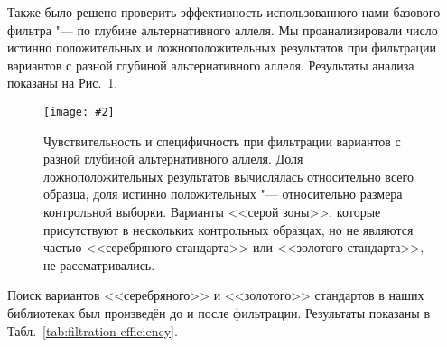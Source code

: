 \documentclass[a4paper,14pt]{extarticle}
\newcommand{\centerfigure}[5]
{\begin{figure}[#1]\centering\texttt{[image: \#2]}\caption{\label{#3}#4}\end{figure}}
\newcommand{\picref}[1]{Рис.~\ref{#1}}
\newcommand{\tableref}[1]{Табл.~\ref{#1}}
\begin{document}
Также было решено проверить эффективность использованного нами базового фильтра "--- по глубине альтернативного аллеля.
Мы проанализировали число истинно положительных и ложноположительных результатов при фильтрации вариантов с разной глубиной альтернативного аллеля.
Результаты анализа показаны на \picref{fig:true-false-depth}.

\centerfigure{hp!}{True-false-depth.pdf}{fig:true-false-depth}{Чувствительность и специфичность при фильтрации вариантов с разной глубиной альтернативного аллеля. Доля ложноположительных результатов вычислялась относительно всего образца, доля истинно положительных "--- относительно размера контрольной выборки. Варианты <<серой зоны>>, которые присутствуют в нескольких контрольных образцах, но не являются частью <<серебряного стандарта>> или <<золотого стандарта>>, не рассматривались.}{1.0}

Поиск вариантов <<серебряного>> и <<золотого>> стандартов в наших библиотеках был произведён до и после фильтрации.
Результаты показаны в \tableref{tab:filtration-efficiency}.
\end{document}
